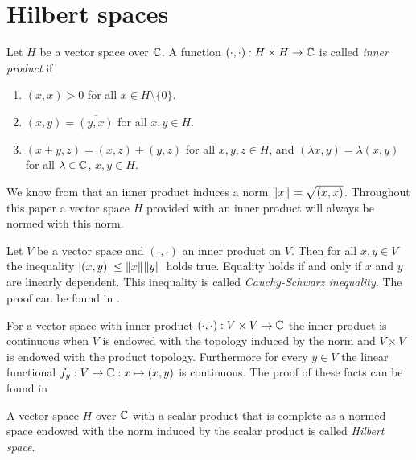 \section{Hilbert spaces}

\begin{definition}
	Let $H$ be a vector space over $\mathbb{C}$. A function $(\cdot, \cdot): H \times H \to \mathbb{C}$ is called \textit{inner product} if 
	\begin{enumerate}
		\item $(x,x) > 0$ for all $x \in H \setminus \{0\}$.
		\item $(x,y) = \overline{(y,x)}$ for all $x,y \in H$.
		\item $(x + y, z) = (x,z) + (y,z)$ for all $x,y,z \in H$, and $(\lambda x, y) = \lambda (x,y)$ for all $\lambda \in \mathbb{C}$, $x,y \in H$. 
	\end{enumerate}
\end{definition}


\begin{remark}
	We know from \cite[p.41]{FAna1} that an inner product induces a norm ${\left \| x \right \|}_{} = \sqrt{{\left ( x, x \right )}}$. Throughout this paper a vector space $H$ provided with an inner product will always be normed with this norm.
\end{remark}


\begin{remark} \label{remark:csb}
	Let $V$ be a vector space and $(\cdot, \cdot)$ an inner product on $V$. Then for all $x,y \in V$ the inequality ${\left | (x,y) \right |} \leq {\left \| x \right \|}_{} {\left \| y \right \|}_{}$ holds true. Equality holds if and only if $x$ and $y$ are linearly dependent. This inequality is called \textit{Cauchy-Schwarz inequality}. The proof can be found in \cite[p. 41]{FAna1}.
\end{remark}


\begin{remark} \label{remark:inner_product_continuity}
	For a vector space with inner product $(\cdot, \cdot): V \times V \to \mathbb{C}$ the inner product is continuous when $V$ is endowed with the topology induced by the norm and $V \times V$ is endowed with the product topology. Furthermore for every $y \in V$ the linear functional $f_y:V \to \mathbb{C}: x \mapsto (x,y)$ is continuous. The proof of these facts can be found in \cite[p.43]{FAna1} 
\end{remark}

\begin{definition}
	A vector space $H$ over $\mathbb{C}$ with a scalar product that is complete as a normed space endowed with the norm induced by the scalar product is called \textit{Hilbert space}.
\end{definition}

